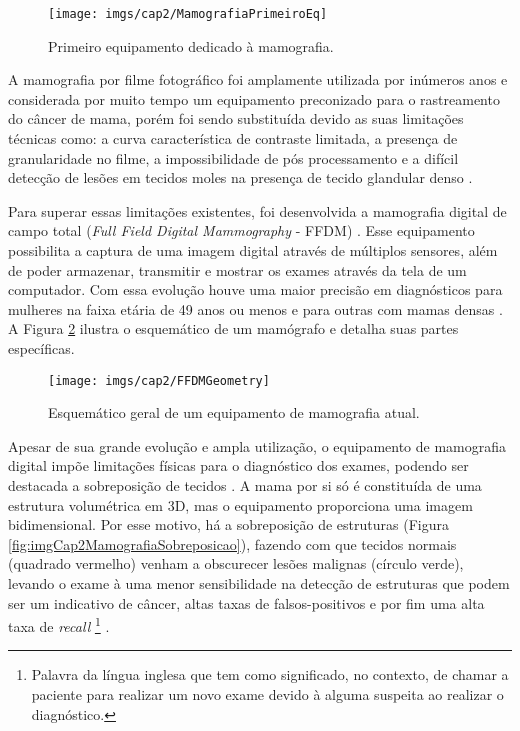 \begin{figure}[H]
	\caption{Primeiro equipamento dedicado à mamografia.}
	\begin{center}
		\texttt{[image: imgs/cap2/MamografiaPrimeiroEq]}
	\end{center}
	\label{fig:imgCap2MamografiaPrimeiroEq}
\end{figure}

A mamografia por filme fotográfico foi amplamente utilizada por inúmeros anos e considerada por muito tempo um equipamento preconizado para o rastreamento do câncer de mama, porém foi sendo substituída devido as suas limitações técnicas como: a curva característica de contraste limitada, a presença de granularidade no filme, a impossibilidade de pós processamento e a difícil detecção de lesões em tecidos moles na presença de tecido glandular denso \cite{karellas2008breast,lewin2001comparison}. 

Para superar essas limitações existentes, foi desenvolvida a mamografia digital de campo total (\textit{Full Field Digital Mammography} - \acs{FFDM})  \cite{nishikawa1987scanned,yaffe1988development}. Esse equipamento possibilita a captura de uma imagem digital através de múltiplos sensores, além de poder armazenar, transmitir e mostrar os exames através da tela de um computador. Com essa evolução houve uma maior precisão em diagnósticos para mulheres na faixa etária de 49 anos ou menos e para outras com mamas densas \cite{vedantham2015digital}. A Figura \ref{fig:imgCap2EsquematicoMamografia} ilustra o esquemático de um mamógrafo e detalha suas partes específicas. 

\begin{figure}[H]
	\caption{Esquemático geral de um equipamento de mamografia atual.}
	\begin{center}
		\texttt{[image: imgs/cap2/FFDMGeometry]}
	\end{center}
	\label{fig:imgCap2EsquematicoMamografia}
\end{figure}

Apesar de sua grande evolução e ampla utilização, o equipamento de mamografia digital impõe limitações físicas para o diagnóstico dos exames, podendo ser destacada a sobreposição de tecidos \cite{vedantham2015digital}. A mama por si só é constituída de uma estrutura volumétrica em \acs{3D}, mas o equipamento proporciona uma imagem bidimensional. Por esse motivo, há a sobreposição de estruturas (Figura \ref{fig:imgCap2MamografiaSobreposicao}), fazendo com que tecidos normais (quadrado vermelho) venham a obscurecer lesões malignas (círculo verde), levando o exame à uma menor sensibilidade na detecção de estruturas que podem ser um indicativo de câncer, altas taxas de falsos-positivos e por fim uma alta taxa de \textit{recall} \footnote{Palavra da língua inglesa que tem como significado, no contexto, de chamar a paciente para realizar um novo exame devido à alguma suspeita ao realizar o diagnóstico.} \cite{roth2014digital}. 

